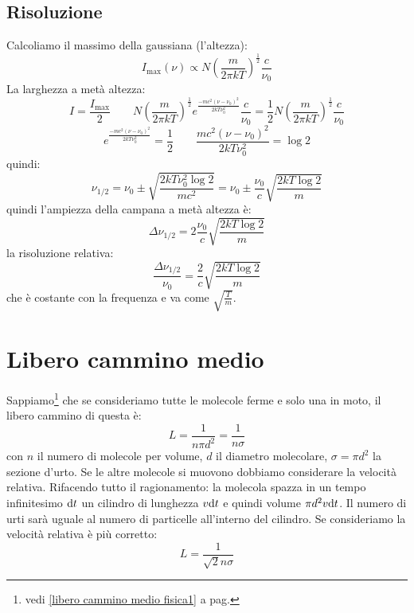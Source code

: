 \subsection{Risoluzione}
Calcoliamo il massimo della gaussiana (l'altezza):
\begin{equation}
	I_{\max}(\nu)\propto N\left(\frac{m}{2\pi kT}\right)^{\frac{1}{2}}\frac{c}{\nu_0}
\end{equation}
La larghezza a metà altezza:
\[
	I=\frac{I_{\max}}{2}\qquad N\left(\frac{m}{2\pi kT}\right)^{\frac{1}{2}}e^{\frac{-mc^2\left(\nu-\nu_0\right)^2}{2kT\nu_0^2}}\frac{c}{\nu_0}=\frac{1}{2}N\left(\frac{m}{2\pi kT}\right)^{\frac{1}{2}}\frac{c}{\nu_0}
\]
\[
	e^{\frac{-mc^2\left(\nu-\nu_0\right)^2}{2kT\nu_0^2}}=\frac{1}{2}\qquad \frac{mc^2\left(\nu-\nu_0\right)^2}{2kT\nu_0^2}=\log 2
\]
quindi:
\begin{equation}
	\nu_{1/2}=\nu_0\pm\sqrt{\frac{2kT\nu_0^2\log 2}{mc^2}}=\nu_0\pm\frac{\nu_0}{c}\sqrt{\frac{2kT\log 2}{m}}
\end{equation}
quindi l'ampiezza della campana a metà altezza è:
\begin{equation}
	\Delta \nu_{1/2}=2\frac{\nu_0}{c}\sqrt{\frac{2kT\log 2}{m}}
\end{equation}
la risoluzione relativa:
\begin{equation}
	\frac{\Delta \nu_{1/2}}{\nu_0}=\frac{2}{c}\sqrt{\frac{2kT\log 2}{m}}
\end{equation}
che è costante con la frequenza e va come $\sqrt{\frac{T}{m}}$.
\section{Libero cammino medio}
Sappiamo\footnote{vedi \ref{libero cammino medio fisica1} a pag.\@\pageref{libero cammino medio fisica1}} che se consideriamo tutte le molecole ferme e solo una in moto, il libero cammino di questa è:
\begin{equation}
	L=\frac{1}{n\pi d^2}=\frac{1}{n\sigma}
\end{equation}
con $n$ il numero di molecole per volume, $d$ il diametro molecolare, $\sigma=\pi d^2$ la sezione d'urto. Se le altre molecole si muovono dobbiamo considerare la velocità relativa. Rifacendo tutto il ragionamento: la molecola spazza in un tempo infinitesimo $\mathrm{d} t$ un cilindro di lunghezza $v\mathrm{d} t$ e quindi volume $\pi d^2 v\mathrm{d} t$. Il numero di urti sarà uguale al numero di particelle all'interno del cilindro. Se consideriamo la velocità relativa è più corretto:
\begin{equation}
	\label{eq:libero_cammino_medio_rif}
	L=\frac{1}{\sqrt{2}n\sigma}
\end{equation}
